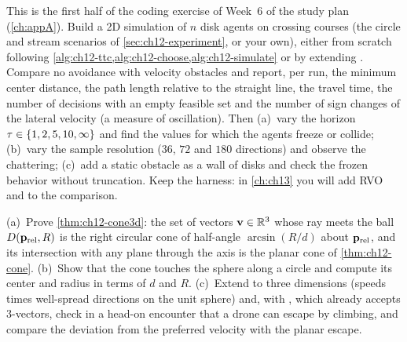 \begin{exercise}
\label{exr:ch12-coding}
This is the first half of the coding exercise of Week~6 of the study plan
(\cref{ch:appA}). Build a 2D simulation of $n$ disk agents on crossing courses
(the circle and stream scenarios of \cref{sec:ch12-experiment}, or your own),
either from scratch following \cref{alg:ch12-ttc,alg:ch12-choose,alg:ch12-simulate}
or by extending . Compare no avoidance
with velocity obstacles and report, per run, the minimum center distance, the
path length relative to the straight line, the travel time, the number of
decisions with an empty feasible set and the number of sign changes of the
lateral velocity (a measure of oscillation). Then (a)~vary the horizon
$\tau \in \left\{ 1, 2, 5, 10, \infty \right\}$ and find the values for which the agents
freeze or collide; (b)~vary the sample resolution ($36$, $72$ and $180$
directions) and observe the chattering; (c)~add a static obstacle as a wall of
disks and check the frozen behavior without truncation. Keep the harness: in
\cref{ch:ch13} you will add RVO and \orca to the comparison.
\end{exercise}

\begin{exercise}
\label{exr:ch12-3d}
(a)~Prove \cref{thm:ch12-cone3d}: the set of vectors $\mathbf{v} \in \mathbb{R}^3$ whose ray
meets the ball $D(\mathbf{p}_{\mathrm{rel}},R)$ is the right circular cone of
half-angle $\arcsin(R/d)$ about $\mathbf{p}_{\mathrm{rel}}$, and its intersection
with any plane through the axis is the planar cone of \cref{thm:ch12-cone}.
(b)~Show that the cone touches the sphere along a circle and compute its
center and radius in terms of $d$ and $R$. (c)~Extend 
to three dimensions (speeds times well-spread directions on the unit sphere)
and, with , which already accepts 3-vectors, check in
a head-on encounter that a drone can escape by climbing, and compare the
deviation from the preferred velocity with the planar escape.
\end{exercise}
